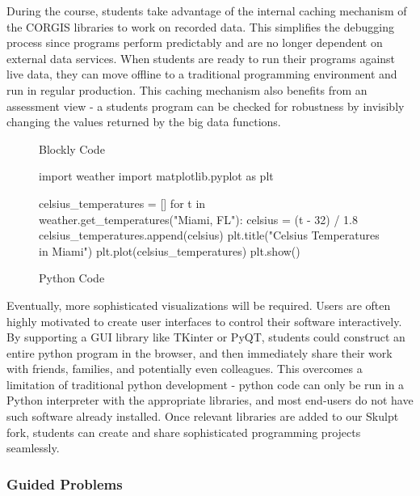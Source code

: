 During the course, students take advantage of the internal caching mechanism of the CORGIS libraries to work on recorded data.
This simplifies the debugging process since programs perform predictably and are no longer dependent on external data services.
When students are ready to run their programs against live data, they can move offline to a traditional programming environment and run in regular production.
This caching mechanism also benefits from an assessment view - a students program can be checked for robustness by invisibly changing the values returned by the big data functions.

\begin{figure*}[ht]
\centering
\begin{minipage}[b]{.75\linewidth}
\caption{Blockly Code}
\label{fig-example-blockly}
\end{minipage}

\smallskip

\begin{minipage}[b]{.75\linewidth}
\caption{Python Code}
\label{fig-example-python}
\begin{python}
import weather
import matplotlib.pyplot as plt

celsius_temperatures = []
for t in weather.get_temperatures("Miami, FL"):
	celsius = (t - 32) / 1.8
	celsius_temperatures.append(celsius)
plt.title("Celsius Temperatures in Miami")
plt.plot(celsius_temperatures)
plt.show()
\end{python}
\end{minipage}
\end{figure*}


Eventually, more sophisticated visualizations will be required.
Users are often highly motivated to create user interfaces to control their software interactively.
By supporting a GUI library like TKinter or PyQT, students could construct an entire python program in the browser, and then immediately share their work with friends, families, and potentially even colleagues.
This overcomes a limitation of traditional python development - python code can only be run in a Python interpreter with the appropriate libraries, and most end-users do not have such software already installed.
Once relevant libraries are added to our Skulpt fork, students can create and share sophisticated programming projects seamlessly.

\subsubsection{Guided Problems}

